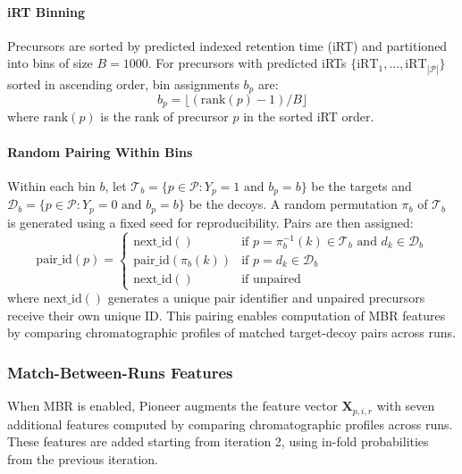 \documentclass[pdflatex,sn-nature]{sn-jnl}
\begin{document}
\paragraph{iRT Binning}\label{para:irt-binning} Precursors are sorted by predicted indexed retention time (iRT) and partitioned into bins of size $B = 1000$. For precursors with predicted iRTs $\{\text{iRT}_1, \ldots, \text{iRT}_{|\mathcal{P}|}\}$ sorted in ascending order, bin assignments $b_p$ are:
\begin{equation}
  b_p = \lfloor (\text{rank}(p) - 1) / B \rfloor
\end{equation}
where $\text{rank}(p)$ is the rank of precursor $p$ in the sorted iRT order.

\paragraph{Random Pairing Within Bins}\label{para:random-pairing-within-bins} Within each bin $b$, let $\mathcal{T}_b = \{p \in \mathcal{P} : Y_p = 1 \text{ and } b_p = b\}$ be the targets and $\mathcal{D}_b = \{p \in \mathcal{P} : Y_p = 0 \text{ and } b_p = b\}$ be the decoys. A random permutation $\pi_b$ of $\mathcal{T}_b$ is generated using a fixed seed for reproducibility. Pairs are then assigned:
\begin{equation}
  \text{pair\_id}(p) = \begin{cases}
      \text{next\_id}() & \text{if } p = \pi_b^{-1}(k) \in \mathcal{T}_b \text{ and } d_k \in \mathcal{D}_b \\
      \text{pair\_id}(\pi_b(k)) & \text{if } p = d_k \in \mathcal{D}_b \\
      \text{next\_id}() & \text{if unpaired}
  \end{cases}
\end{equation}
where $\text{next\_id}()$ generates a unique pair identifier and unpaired precursors receive their own unique ID. This pairing enables computation of MBR features by comparing chromatographic profiles of matched target-decoy pairs across runs.

\subsubsection{Match-Between-Runs Features}\label{sec:mbr_features}

When MBR is enabled, Pioneer augments the feature vector $\mathbf{X}_{p,i,r}$ with seven additional features computed by comparing chromatographic profiles across runs. These features are added starting from iteration 2, using in-fold probabilities from the previous iteration.
\end{document}
